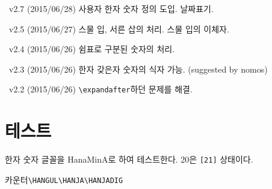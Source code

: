 \documentclass[b5paper,nanum]{oblivoir}
\def\cs#1{\texttt{\textbackslash #1}}
\def\ct#1{\texttt{#1}}
\begin{document}
\noindent\textbullet\ v2.7 (2015/06/28) 사용자 한자 숫자 정의 도입. 날짜표기.

\noindent\textbullet\ v2.5 (2015/06/27) 스물 입, 서른 삽의 처리. 스물 입의 이체자. 

\noindent\textbullet\ v2.4 (2015/06/26) 쉼표로 구분된 숫자의 처리.

\noindent\textbullet\ v2.3 (2015/06/26) 한자 갖은자 숫자의 식자 가능. (suggested by nomos)

\noindent\textbullet\ v2.2 (2015/06/26) \cs{expandafter}하던 문제를 해결.

\clearpage

\section{테스트}

한자 숫자 글꼴을 HanaMinA로 하여 테스트한다. 20은 \ct{[21]} 상태이다.
\TwentyHanjaChar[21]

\bigskip


\parindent=0pt
\long{}

\setcounter{foo}{-1}
카운터\tab \cs{HANGUL}\tab \cs{HANJA}\tab \cs{HANJADIG} \\

\setcounter{foo}{80}

\setcounter{foo}{1000}
\thefoo\tab {}\tab {}\tab {} \par

\setcounter{foo}{\the\year}
\thefoo\tab {}\tab {}\tab {} \par
\end{document}
